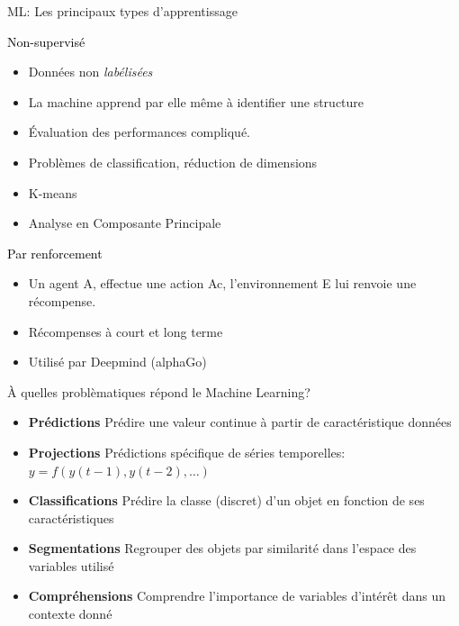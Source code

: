 \documentclass[aspectratio=169, 11pt]{beamer}
\begin{document}
\begin{frame}{ML: Les principaux types d'apprentissage}
  \begin{minipage}{.48\textwidth}
    \begin{beamerboxesrounded}[scheme=suppervise,lower=box,width=0.95\textwidth]{\textcolor{black}{Non-supervisé}}
      \begin{itemize}
        \scriptsize
      \item Données non \textit{labélisées}
      \item La machine apprend par elle même à identifier une structure
      \item Évaluation des performances compliqué.
      \item Problèmes de classification, réduction de dimensions
      \item K-means
      \item Analyse en Composante Principale
      \end{itemize}
    \end{beamerboxesrounded}
  \end{minipage}
  \hfill
  \begin{minipage}{.48\textwidth}
    \begin{beamerboxesrounded}[scheme=suppervise,lower=box,width=0.95\textwidth]{\textcolor{black}{Par renforcement}}
      \begin{itemize}
        \scriptsize
        \vspace{0.7cm}
      \item Un agent A, effectue une action Ac, l'environnement E lui renvoie une récompense.
      \item Récompenses à court et long terme
      \item Utilisé par Deepmind (alphaGo)
        \vspace{0.7cm}
      \end{itemize}
    \end{beamerboxesrounded}
  \end{minipage}  
\end{frame}

\begin{frame}{À quelles problèmatiques répond le Machine Learning?}
  \begin{itemize}
  \item \textcolor{agaetisOrange}{\textbf{Prédictions}} Prédire une valeur continue à partir de caractéristique données
  \item \textcolor{agaetisOrange}{\textbf{Projections}} Prédictions spécifique de séries temporelles: $y = f(y(t-1), y(t-2), \dots)$
  \item \textcolor{agaetisOrange}{\textbf{Classifications}} Prédire la classe (discret) d'un objet en fonction de ses caractéristiques
  \item \textcolor{agaetisOrange}{\textbf{Segmentations}} Regrouper des objets par similarité dans l'espace des variables utilisé
  \item \textcolor{agaetisOrange}{\textbf{Compréhensions}} Comprendre l'importance de variables d'intérêt dans un contexte donné
  \end{itemize}
\end{frame}
\end{document}
